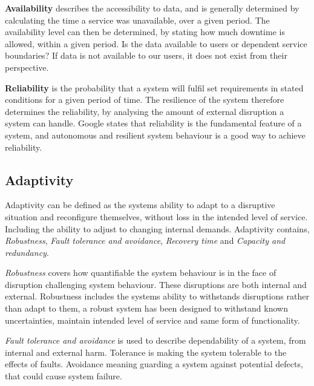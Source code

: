 \textbf{Availability} describes the accessibility to data, and is generally determined by calculating the time a service was unavailable, over a given period. The availability level can then be determined, by stating how much downtime is allowed, within a given period\cite[p. 477]{beyer2016siteReliabilityEngineering}. Is the data available to users or dependent service boundaries? If data is not available to our users, it does not exist from their perspective\cite[p. 345]{beyer2016siteReliabilityEngineering}.


\textbf{Reliability} is the probability that a system will fulfil set requirements in stated conditions for a given period of time\cite{o2012practical}. The resilience of the system therefore determines the reliability, by analysing the amount of external disruption a system can handle. Google states that reliability is the fundamental feature of a system, and autonomous and resilient system behaviour is a good way to achieve reliability\cite[p. 84]{beyer2016siteReliabilityEngineering}.


\subsection{Adaptivity} 
Adaptivity can be defined as the systems ability to adapt to a disruptive situation and reconfigure themselves, without loss in the intended level of service. Including the ability to adjust to changing internal demands\cite{reed2009methodology}. Adaptivity contains, \textit{Robustness}, \textit{Fault tolerance and avoidance}, \textit{Recovery time} and \textit{Capacity and redundancy}.


\textit{Robustness} covers how quantifiable the system behaviour is in the face of disruption challenging system behaviour\cite[p. 10]{sterbenz2010resilience}. These disruptions are both internal and external\cite{omer2013resilience}. Robustness includes the systems ability to withstands disruptions rather than adapt to them, a robust system has been designed to withstand known uncertainties, maintain intended level of service and same form of functionality.

\textit{Fault tolerance and avoidance} is used to describe dependability of a system, from internal and external harm. Tolerance is making the system tolerable to the effects of faults. Avoidance meaning guarding a system against potential defects, that could cause system failure\cite{strigini2012fault}.


